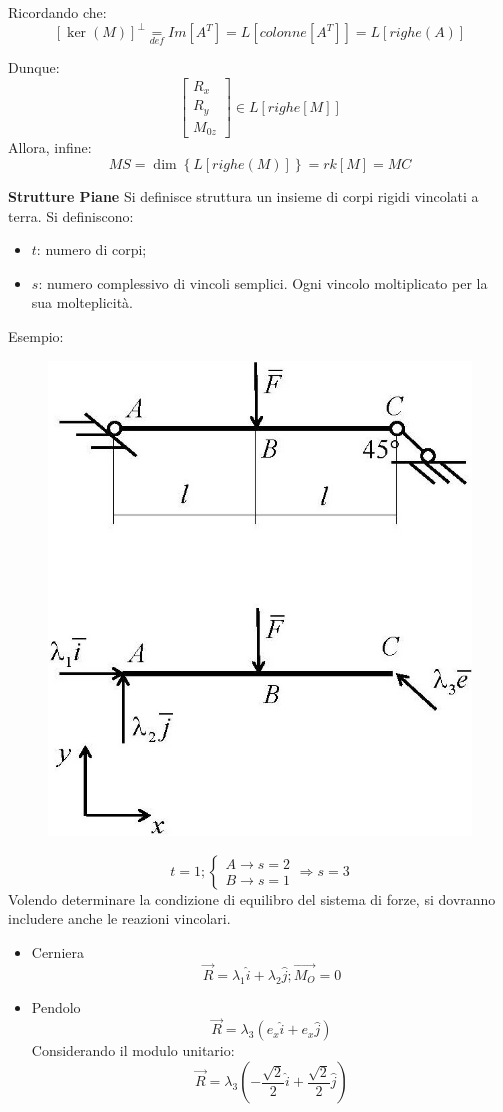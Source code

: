 \documentclass{article}
\begin{document}
\begin{adjustwidth}{2in}{}
Ricordando che: 
\[
[\ker(M)]^{\perp} \underset{def}{=} Im[A^T] = L[colonne[A^T]] = L[righe(A)]
\]

Dunque: 
\[
\left[\begin{array}{c}
	R_{x} \\
	R_{y} \\
	M_{0z}
\end{array}\right] \in L[righe[M]] 
\]
Allora, infine: 
\[
MS = \dim\left\lbrace L[righe(M)] \right\rbrace = rk[M] = MC
\]

 \newpage
{\Large \textbf{Strutture Piane}} \mbox{} \newline
Si definisce struttura un insieme di corpi rigidi vincolati a terra.
Si definiscono: 
\begin{itemize}
	\item $t$: numero di corpi;
	\item $s$: numero complessivo di vincoli semplici. Ogni vincolo moltiplicato per la sua molteplicità. 
\end{itemize}
Esempio: \newline
\begin{figure}[H]
	\centering
	\includegraphics[width=0.25\linewidth]{"immagini/1.PARTE1_Pagina_41"}
\end{figure}
\[
t = 1; \begin{cases}
	A \rightarrow s = 2 \\
	B \rightarrow s = 1
\end{cases} \Rightarrow s = 3
\]
Volendo determinare la condizione di equilibro del sistema di forze, si dovranno includere anche le reazioni vincolari. 
\begin{itemize}
	\item Cerniera \newline
	\[\vec{R} = \lambda_{1} \hat{i} + \lambda_{2} \hat{j}; \vec{M_{O}} = 0\]
	\item Pendolo \newline
	\[\vec{R} = \lambda_{3}(e_{x} \hat{i} + e_{x} \hat{j})\]
	Considerando il modulo unitario:
	\[\vec{R} = \lambda_{3}(-\frac{\sqrt{2}}{2} \hat{i} + \frac{\sqrt{2}}{2} \hat{j})\]
\end{itemize}


\end{adjustwidth}
\end{document}
